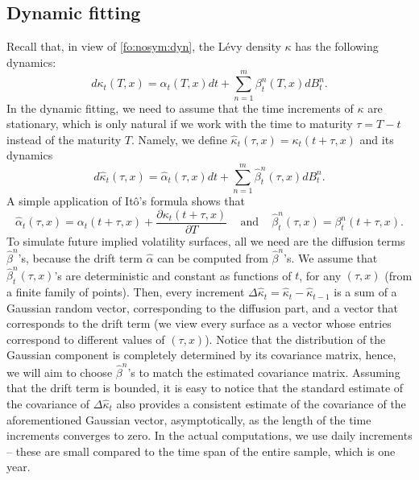 \documentclass{article}
\numberwithin{equation}{section}
\def\halpha{\hat{\alpha}}
\def\hbeta{\hat{\beta}}
\def\hkappa{\hat{\kappa}}
\begin{document}
\subsection{Dynamic fitting}
\label{sec:implementation:dynamic}

Recall that, in view of \eqref{fo:nosym:dyn}, the L\'evy density $\kappa$ has the following dynamics: 
\begin{equation} \label{fo:implementation:kappadynamics}
d\kappa_t(T,x) = \alpha_t(T,x)dt + \sum_{n=1}^m \beta^n_t(T,x) dB_t^n. 
\end{equation}   
In the dynamic fitting, we need to assume that the time increments of $\kappa$ are stationary, which is only natural if we work with the time to maturity $\tau = T - t$ instead of the maturity $T$. Namely, we define $\hkappa_t(\tau,x) = \kappa_t(t+\tau,x)$ and its dynamics
\begin{equation}\label{fo:implementation:tkappadynamics} 
d\hkappa_t(\tau,x) = \halpha_t(\tau,x) dt +  \sum_{n=1}^m \hbeta^n_t(\tau,x) dB_t^n.
\end{equation}   
A simple application of It\^o's formula shows that
\begin{equation}
\halpha_t(\tau,x) = \alpha_t(t+\tau,x) + \frac{\partial \kappa_t(t+\tau, x)}{\partial T}\,\,\,\,\,\,\, \text{and}\,\,\,\,\,\,\,\hbeta^n_t(\tau,x) = \beta^n_t(t+\tau,x).
\end{equation}
To simulate future implied volatility surfaces, all we need are the diffusion terms $\hbeta^n$'s, because the drift term $\halpha$ can be computed from $\hbeta^n$'s. We assume that $\hbeta^n_t(\tau,x)$'s are deterministic and constant as functions of $t$, for any $(\tau,x)$ (from a finite family of points). Then, every increment $\Delta\hkappa_t = \hkappa_{t}-\hkappa_{t-1}$ is a sum of a Gaussian random vector, corresponding to the diffusion part, and a vector that corresponds to the drift term (we view every surface as a vector whose entries correspond to different values of $(\tau,x)$). Notice that the distribution of the Gaussian component is completely determined by its covariance matrix, hence, we will aim to choose $\hbeta^n$'s to match the estimated covariance matrix. Assuming that the drift term is bounded, it is easy to notice that the standard estimate of the covariance of $\Delta \hkappa_t$ also provides a consistent estimate of the covariance of the aforementioned Gaussian vector, asymptotically, as the length of the time increments converges to zero. In the actual computations, we use daily increments -- these are small compared to the time span of the entire sample, which is one year.
\end{document}

